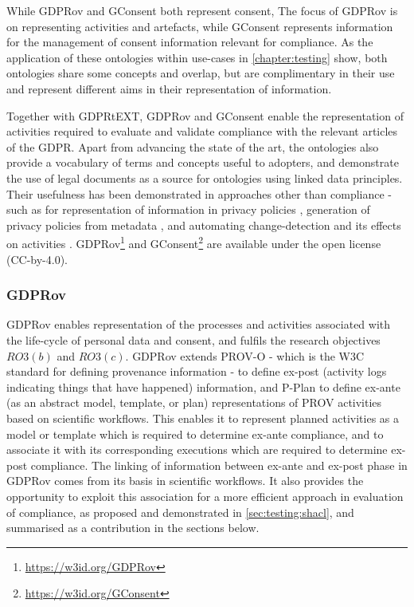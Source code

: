 While GDPRov and GConsent both represent consent, The focus of GDPRov is on representing activities and artefacts, while GConsent represents information for the management of consent information relevant for compliance.
As the application of these ontologies within use-cases in \autoref{chapter:testing} show, both ontologies share some concepts and overlap, but are complimentary in their use and represent different aims in their representation of information.

Together with GDPRtEXT, GDPRov and GConsent enable the representation of activities required to evaluate and validate compliance with the relevant articles of the GDPR. Apart from advancing the state of the art, the ontologies also provide a vocabulary of terms and concepts useful to adopters, and demonstrate the use of legal documents as a source for ontologies using linked data principles.
Their usefulness has been demonstrated in approaches other than compliance - such as for representation of information in privacy policies \cite{pandit_ontology_2018}, generation of privacy policies from metadata \cite{pandit_personalised_2018}, and automating change-detection and its effects on activities \cite{pandit_gdpr-driven_2018}.
GDPRov\footnote{\url{https://w3id.org/GDPRov}} and GConsent\footnote{\url{https://w3id.org/GConsent}} are available under the open license (CC-by-4.0).

\subsubsection{GDPRov}
GDPRov enables representation of the processes and activities associated with the life-cycle of personal data and consent, and  fulfils the research objectives $RO3(b)$ and $RO3(c)$.
GDPRov extends PROV-O \cite{lebo_prov-o_2013} - which is the W3C standard for defining provenance information - to define ex-post (activity logs indicating things that have happened) information, and P-Plan \cite{garijo_p-plan_2014} to define ex-ante (as an abstract model, template, or plan) representations of PROV activities based on scientific workflows.
This enables it to represent planned activities as a model or template which is required to determine ex-ante compliance, and to associate it with its corresponding executions which are required to determine ex-post compliance.
The linking of information between ex-ante and ex-post phase in GDPRov comes from its basis in scientific workflows. It also provides the opportunity to exploit this association for a more efficient approach in evaluation of compliance, as proposed and demonstrated in \autoref{sec:testing:shacl}, and summarised as a contribution in the sections below.


